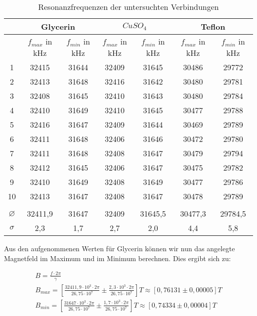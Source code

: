 \begin{table}[h]
	\caption{Resonanzfrequenzen der untersuchten Verbindungen}
	\begin{tabular}{|c|c|c|c|c|c|c|}
	\hline
	& \multicolumn{2}{|c|}{Glycerin} & \multicolumn{2}{|c|}{$CuSO_4$} & \multicolumn{2}{|c|}{Teflon} \\ \hline
	 & $f_{max}$ in kHz & $f_{min}$ in kHz & $f_{max}$ in kHz & $f_{min}$ in kHz & $f_{max}$ in kHz & $f_{min}$ in kHz\\ \hline
	 1 & 32415 & 31644 & 32409 & 31645 & 30486 & 29772 \\ \hline
	 2 & 32413 & 31648 & 32416 & 31642 & 30480 & 29781 \\ \hline
	 3 & 32408 & 31645 & 32410 & 31643 & 30480 & 29784 \\ \hline
	 4 & 32410 & 31649 & 32410 & 31645 & 30477 & 29788 \\ \hline
	 5 & 32416 & 31647 & 32409 & 31644 & 30469 & 29789 \\ \hline
	 6 & 32411 & 31648 & 32406 & 31646 & 30472 & 29780 \\ \hline
	 7 & 32411 & 31648 & 32408 & 31647 & 30479 & 29794 \\ \hline
	 8 & 32412 & 31645 & 32406 & 31647 & 30475 & 29782 \\ \hline
	 9 & 32410 & 31649 & 32408 & 31649 & 30477 & 29786 \\ \hline
	 10 & 32413 & 31647 & 32408 & 31647 & 30478 & 29789 \\ \hline \\ \hline
	 $ \varnothing $ & 32411,9 & 31647 & 32409 & 31645,5 & 30477,3 & 29784,5 \\ \hline
	 $\sigma$ & 2,3 & 1,7 & 2,7 & 2,0 & 4,4 & 5,8 \\ \hline
	\end{tabular}
\label{freqs}
\end{table}

Aus den aufgenommenen Werten für Glycerin können wir nun das angelegte Magnetfeld im Maximum und im Minimum berechnen. Dies ergibt sich zu:

\begin{gather}
B=\frac{f \cdot 2\pi}{\gamma} \\
B_{max}=\left[\frac{32411,9 \cdot 10^3 \cdot 2\pi}{26,75 \cdot 10^7} \pm \frac{2,3 \cdot 10^3 \cdot 2\pi}{26,75 \cdot 10^7}\right] T  \approx \left[0,76131  \pm 0,00005\right] T \\
B_{min}=\left[\frac{31647 \cdot 10^3 \cdot 2\pi}{26,75 \cdot 10^7} \pm \frac{1,7 \cdot 10^3 \cdot 2\pi}{26,75 \cdot 10^7}\right] T  \approx \left[0,74334 \pm 0,00004 \right] T
\end{gather}

